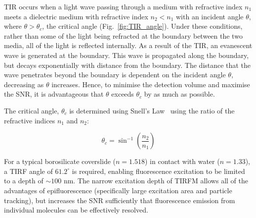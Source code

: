 TIR occurs when a light wave passing through a medium with refractive index $n_1$ meets a dielectric medium with refractive index $n_2 < n_1$ with an incident angle $\theta$, where $\theta > \theta_c$, the critical angle (Fig.~\ref{fig:TIR_angle}). Under these conditions, rather than some of the light being refracted at the boundary between the two media, all of the light is reflected internally. As a result of the TIR, an evanescent wave is generated at the boundary. This wave is propagated along the boundary, but decays exponentially with distance from the boundary. The distance that the wave penetrates beyond the boundary is dependent on the incident angle $\theta$, decreasing as $\theta$ increases. Hence, to minimise the detection volume and maximise the SNR, it is advantageous that $\theta$ exceeds $\theta_c$ by as much as possible. 

The critical angle, $\theta_c$ is determined using Snell's Law~\cite{???} using the ratio of the refractive indices $n_1$ and $n_2$:

\begin{equation}
\theta_c = \sin^{-1}\left(\frac{n_2}{n_1}\right)
\label{eq:snell}
\end{equation}

For a typical borosilicate coverslide ($n = 1.518$) in contact with water ($n = 1.33$), a TIRF angle of $61.2^{\circ}$ is required, enabling fluorescence excitation to be limited to a depth of $\sim 100$ nm. The narrow excitation depth of TIRFM allows all of the advantages of epifluorescence (specifically large excitation area and particle tracking), but increases the SNR sufficiently that fluorescence emission from individual molecules can be effectively resolved.

